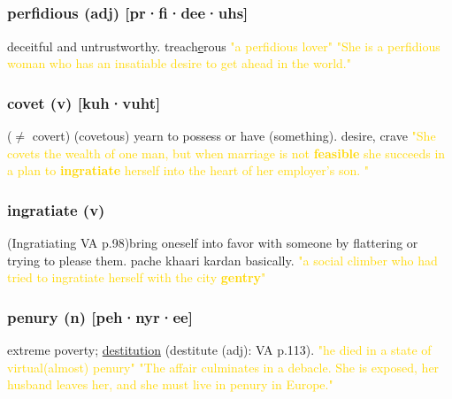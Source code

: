 \documentclass{proc}
\begin{document}
	\newpage
	\subsection{}
	\subsubsection{\textcolor{brickred}{perfidious} (adj) [pr·fi·dee·uhs]}
	deceitful and untrustworthy. treach\underline{e}rous
	\textcolor{gold}{"a perfidious lover" "She is a perfidious woman who has an insatiable desire to get 
		ahead in the world."}
	
	\subsubsection{\textcolor{brickred}{covet} (v) [kuh·vuht]}
	($\ne$ covert) (covetous) yearn to possess or have (something). desire, crave
	\textcolor{gold}{ "She covets the wealth of one man, but 
		when marriage is not \textbf{feasible} she succeeds in a plan to 
		\textbf{ingratiate} herself into the heart of her employer's son. "}
	
	\subsubsection{\textcolor{brickred}{ingratiate} (v)}
	(Ingratiating VA p.98)bring oneself into favor with someone by flattering or trying to please them. pache khaari kardan basically.
	\textcolor{gold}{"a social climber who had tried to ingratiate herself with the city \textbf{gentry}"}
	
	\subsubsection{\textcolor{brickred}{penury} (n) [peh·nyr·ee]}
	extreme poverty; \underline{destitution} (destitute (adj): VA p.113).
	\textcolor{gold}{"he died in a state of virtual(almost) penury" "The affair culminates in a debacle. She is exposed, her 
		husband leaves her, and she must live in penury in Europe."}
	
\end{document}
